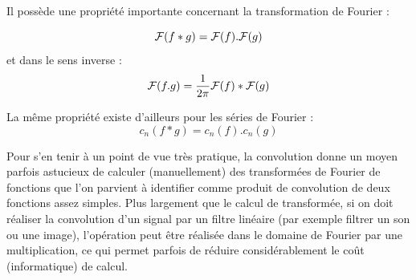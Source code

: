 Il possède une propriété importante concernant la transformation de Fourier :

\begin{equation} \label{convol_transfo1}
{\cal F}(f*g)={\cal F}(f).{\cal F}(g)
\end{equation}
et dans le sens inverse :
\begin{equation}
  {\cal F}(f.g)=\frac{1}{2\pi}{\cal F}(f)*{\cal F}(g)
\end{equation}

La même propriété existe d'ailleurs pour les séries de Fourier :
\begin{equation}
c_n(f*g)=c_n(f).c_n(g)
\end{equation}

Pour s'en tenir à un point de vue très pratique, la convolution donne un moyen parfois astucieux de calculer (manuellement) des transformées de Fourier de fonctions que l'on parvient à identifier comme produit de convolution de deux fonctions assez simples. 
Plus largement que le calcul de transformée, si on doit réaliser la convolution d'un signal par un filtre linéaire (par exemple filtrer un son ou une image), l'opération peut être réalisée dans le domaine de Fourier par une multiplication, ce qui permet parfois de réduire considérablement le coût (informatique) de calcul.

